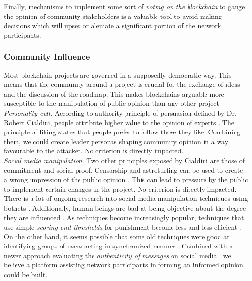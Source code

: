 \documentclass[12pt,a4paper]{article}
\begin{document}
Finally, mechanisms to implement some sort of \textit{voting on the blockchain} to gauge the opinion of community stakeholders is a valuable tool to avoid making decisions which will upset or aleniate a significant portion of the network participants.\\

\subsubsection{Community Influence}

Most blockchain projects are governed in a supposedly democratic way. This means that the community around a project is crucial for the exchange of ideas and the discussion of the roadmap. This makes \glspl{blockchain} arguable more susceptible to the manipulation of public opinion than any other project.\\

\textit{Personality cult}. According to authority principle of persuasion defined by Dr. Robert Cialdini, people attribute higher value to the opinion of experts \cite{influence}. The principle of liking states that people prefer to follow those they like. Combining them, we could create leader personas shaping community opinion in a way favourable to the attacker. No criterion is directly impacted.\\

\textit{Social media manipulation}. Two other principles exposed by Cialdini are those of commitment and social proof. Censorship and astroturfing can be used to create a wrong impression of the public opinion \cite{astroturf}. This can lead to pressure by the public to implement certain changes in the project. No criterion is directly impacted.\\

There is a lot of ongoing research into social media manipulation techniques using botnets \cite{botnet}. Additionally, human beings are bad at being objective about the degree they are influenced \cite{echo}. As techniques become increasingly popular, techniques that use simple \textit{scoring and thresholds} for punishment become less and less efficient \cite{countering}.\\

On the other hand, it seems possible that some old techniques were good at identifying groups of users acting in synchronized manner \cite{copycatch}. Combined with a newer approach evaluating the \textit{authenticity of messages} on social media \cite{authenticity}, we believe a platform assisting network participants in forming an informed opinion could be built.\\
\end{document}
